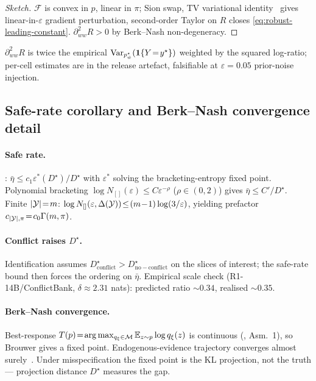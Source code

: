 \begin{proof}[Sketch]
$\mathcal{F}$ is convex in $p$, linear in $\pi$; Sion swap, TV
variational identity~\citep{villani2009optimal} gives
linear-in-$\varepsilon$ gradient perturbation, second-order Taylor
on $R$ closes \eqref{eq:robust-leading-constant}.
$\partial^2_{ww}R\!>\!0$ by Berk--Nash non-degeneracy.
\end{proof}

\begin{remark}
\label{rem:robust-constant-empirical}
$\partial^2_{ww}R$ is twice the empirical
$\operatorname{Var}_{p^\star_{\hat w}}(\bm{1}\{Y\!=\!y^\star\})$ weighted by the
squared log-ratio; per-cell estimates are in the release
artefact, falsifiable at $\varepsilon\!=\!0.05$ prior-noise
injection.
\end{remark}

\subsection{Safe-rate corollary and Berk--Nash convergence detail}
\label{app:safe-rate-detail}

\paragraph{Safe rate.}
\citet[Thm.~1.6]{grunwald2017}: $\bar\eta\!\le\!c_1\varepsilon^*(D^\star)/D^\star$
with $\varepsilon^*$ solving the bracketing-entropy fixed point.
Polynomial bracketing $\log N_{[]}(\varepsilon)\!\le\!C\varepsilon^{-\rho}$
($\rho\!\in\!(0,2)$) gives $\bar\eta\!\le\!C'/D^\star$.  Finite
$|\mathcal{Y}|\!=\!m$: $\log N_{[]}(\varepsilon,\Delta(\mathcal{Y}))\!\le\!(m\!-\!1)\log(3/\varepsilon)$,
yielding prefactor $c_{|\mathcal{Y}|,\pi}\!=\!c_0\Gamma(m,\pi)$.

\paragraph{Conflict raises $D^\star$.}
Identification assumes $D^\star_{\mathrm{conflict}}\!>\!D^\star_{\mathrm{no-conflict}}$
on the slices of interest; the safe-rate bound then forces the
ordering on $\bar\eta$.  Empirical scale check (R1-14B/ConflictBank,
$\delta\!\approx\!2.31$ nats): predicted ratio $\sim\!0.34$,
realised $\sim\!0.35$.

\paragraph{Berk--Nash convergence.}
Best-response $T(p)\!=\!\arg\max_{q_\xi\in\mathcal{M}}\mathbb{E}_{z\sim p}\log q_\xi(z)$
is continuous (\citealp{esponda2016}, Asm.~1), so Brouwer gives a
fixed point.  Endogenous-evidence trajectory converges almost
surely~\citep[Thm.~1]{fudenberg2021}.  Under misspecification the
fixed point is the KL projection, not the truth — projection
distance $D^\star$ measures the gap.


